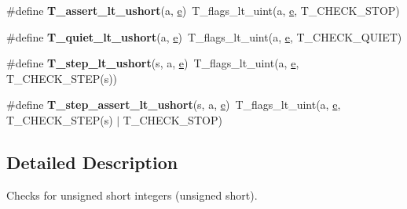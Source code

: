 \begin{DoxyCompactItemize}
\item 
\mbox{\label{group__RTEMSTestFrameworkChecksUShort_ga020aebd7c9c240b80de0e18c965080ff}} 
\#define {\bfseries T\+\_\+assert\+\_\+lt\+\_\+ushort}(a,  \mbox{\hyperlink{sun4u_2tte_8h_a8b0b9ed08e0e18920ec2682f48228c27}{e}})~T\+\_\+flags\+\_\+lt\+\_\+uint(a, \mbox{\hyperlink{sun4u_2tte_8h_a8b0b9ed08e0e18920ec2682f48228c27}{e}}, T\+\_\+\+C\+H\+E\+C\+K\+\_\+\+S\+T\+OP)
\item 
\mbox{\label{group__RTEMSTestFrameworkChecksUShort_gac9473995e9be9b109660267b23062e0f}} 
\#define {\bfseries T\+\_\+quiet\+\_\+lt\+\_\+ushort}(a,  \mbox{\hyperlink{sun4u_2tte_8h_a8b0b9ed08e0e18920ec2682f48228c27}{e}})~T\+\_\+flags\+\_\+lt\+\_\+uint(a, \mbox{\hyperlink{sun4u_2tte_8h_a8b0b9ed08e0e18920ec2682f48228c27}{e}}, T\+\_\+\+C\+H\+E\+C\+K\+\_\+\+Q\+U\+I\+ET)
\item 
\mbox{\label{group__RTEMSTestFrameworkChecksUShort_ga08fed73bf6952d5834d6b70141f46c1a}} 
\#define {\bfseries T\+\_\+step\+\_\+lt\+\_\+ushort}(s,  a,  \mbox{\hyperlink{sun4u_2tte_8h_a8b0b9ed08e0e18920ec2682f48228c27}{e}})~T\+\_\+flags\+\_\+lt\+\_\+uint(a, \mbox{\hyperlink{sun4u_2tte_8h_a8b0b9ed08e0e18920ec2682f48228c27}{e}}, T\+\_\+\+C\+H\+E\+C\+K\+\_\+\+S\+T\+EP(s))
\item 
\mbox{\label{group__RTEMSTestFrameworkChecksUShort_ga608f677a74350e726406a17c9524b61a}} 
\#define {\bfseries T\+\_\+step\+\_\+assert\+\_\+lt\+\_\+ushort}(s,  a,  \mbox{\hyperlink{sun4u_2tte_8h_a8b0b9ed08e0e18920ec2682f48228c27}{e}})~T\+\_\+flags\+\_\+lt\+\_\+uint(a, \mbox{\hyperlink{sun4u_2tte_8h_a8b0b9ed08e0e18920ec2682f48228c27}{e}}, T\+\_\+\+C\+H\+E\+C\+K\+\_\+\+S\+T\+EP(s) $\vert$ T\+\_\+\+C\+H\+E\+C\+K\+\_\+\+S\+T\+OP)
\end{DoxyCompactItemize}


\subsection{Detailed Description}
Checks for unsigned short integers (unsigned short). 


